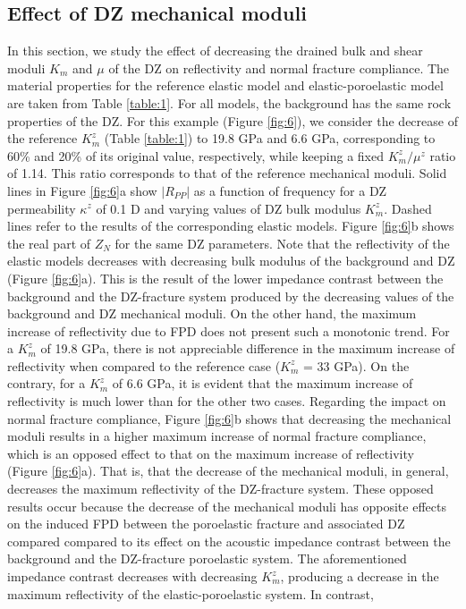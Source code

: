 \documentclass[draft]{agujournal2019}
\begin{document}
\subsection{Effect of DZ mechanical moduli}
In this section, we study the effect of decreasing the drained bulk and shear moduli  $K_m$ and $\mu$ of the DZ  on reflectivity and normal fracture compliance. The material properties for the reference elastic model and elastic-poroelastic model are taken from Table \ref{table:1}. For all models, the background has the same rock properties of the DZ.
For this example  (Figure \ref{fig:6}), we consider the decrease of the reference $K_m^z$ (Table \ref{table:1}) to 19.8 GPa and 6.6 GPa, corresponding to  60\%  and 20\% of its original value, respectively,  while keeping a fixed $K_m^z/\mu^z$ ratio of 1.14. This ratio corresponds to that of the reference mechanical moduli.
Solid lines in Figure \ref{fig:6}a show  $|R_{PP}|$ as a function of frequency for a DZ permeability $ \kappa^z $ of 0.1 D and varying values of DZ bulk modulus $K_m^z$. Dashed lines refer to the results of the corresponding elastic models.
Figure \ref{fig:6}b shows the real part of $Z_N$ for the same DZ parameters. Note that the reflectivity of the elastic models decreases with decreasing bulk modulus of the background and DZ (Figure \ref{fig:6}a). This is the result of the lower impedance  contrast between the background and the DZ-fracture system produced by the decreasing values of the background  and DZ mechanical moduli. On the other hand, the maximum increase of reflectivity due to FPD does not present such a  monotonic trend.
For a  $K_m^z$ of 19.8 GPa, there is not appreciable difference in the maximum increase of reflectivity when compared to the  reference case ($K_m^z$ = 33 GPa). On the contrary, for a  $K_m^z$ of 6.6 GPa, it is evident that the maximum increase of reflectivity is much lower than for the other two cases. Regarding the impact on normal fracture compliance, Figure \ref{fig:6}b shows that decreasing the mechanical moduli results in a higher maximum increase of normal fracture compliance, which is an opposed effect to that on the maximum increase of reflectivity (Figure \ref{fig:6}a). That is, that the decrease of the mechanical moduli, in general, decreases the maximum reflectivity of the DZ-fracture system.
These opposed results occur because the decrease of the mechanical  moduli has opposite effects on the induced FPD between the poroelastic fracture and associated DZ compared compared to its effect on the acoustic impedance contrast  between the background and the DZ-fracture poroelastic system. The aforementioned impedance contrast decreases with decreasing $K_m^z$, producing a decrease in the maximum reflectivity of the elastic-poroelastic system. In contrast,
\end{document}
